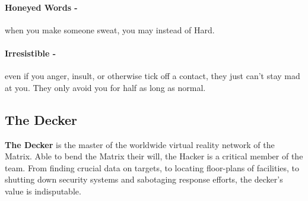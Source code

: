 \paragraph{Honeyed Words -} when you make someone sweat, you may  instead of Hard.

\paragraph{Irresistible -} even if you anger, insult, or otherwise tick off a contact, they just can’t stay mad at you. They only avoid you for half as long as normal.



\clearpage
\subsection{The Decker}
\textbf{The Decker} is the master of the worldwide virtual reality network of the Matrix. Able to bend the Matrix their will, the Hacker is a critical member of the team. From finding crucial data on targets, to locating floor-plans of facilities, to shutting down security systems and sabotaging response efforts, the decker’s value is indisputable.

